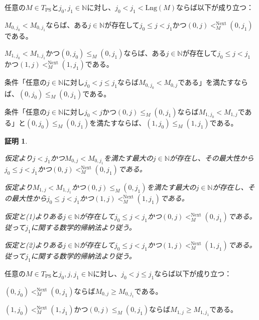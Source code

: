 \documentclass[dvipdfmx,uplatex]{jsarticle}
\theoremstyle{customnonumberbreakfortheorem}
\theoremstyle{customnonumberbreakforproof}
\newtheorem{hideableproof}{証明}
\begin{document}
\begin{proposition}[親の存在の判定条件]\label{親の存在の判定条件}
	任意の\(M \in T_{\textrm{PS}}\)と\(j_0,j_1 \in \mathbb{N}\)に対し、\(j_0 < j_1 < \textrm{Lng}(M)\)ならば以下が成り立つ：
	\begin{penumerate}
		\item \(M_{0,j_0} < M_{0,j_1}\)ならば、ある\(j \in \mathbb{N}\)が存在して\(j_0 \leq j < j_1\)かつ\((0,j) <_M^{\textrm{Next}} (0,j_1)\)である。
		\item \(M_{1,j_0} < M_{1,j_1}\)かつ\((0,j_0) \leq_M (0,j_1)\)ならば、ある\(j \in \mathbb{N}\)が存在して\(j_0 \leq j < j_1\)かつ\((1,j) <_M^{\textrm{Next}} (1,j_1)\)である。
		\item 条件「任意の\(j \in \mathbb{N}\)に対し\(j_0 < j \leq j_1\)ならば\(M_{0,j_0} < M_{0,j}\)である」を満たすならば、\((0,j_0) \leq_M (0,j_1)\)である。
		\item 条件「任意の\(j \in \mathbb{N}\)に対し\(j_0 < j\)かつ\((0,j) \leq_M (0,j_1)\)ならば\(M_{1,j_0} < M_{1,j}\)である」と\((0,j_0) \leq_M (0,j_1)\)を満たすならば、\((1,j_0) \leq_M (1,j_1)\)である。
	\end{penumerate}
\end{proposition}

\begin{hideableproof}
	\begin{penumerate}
		\item 仮定より\(j < j_1\)かつ\(M_{0,j} < M_{0,j_1}\)を満たす最大の\(j \in \mathbb{N}\)が存在し、その最大性から\(j_0 \leq j < j_1\)かつ\((0,j) <_M^{\textrm{Next}} (0,j_1)\)である。
		\item 仮定より\(M_{1,j} < M_{1,j_1}\)かつ\((0,j) \leq_M (0,j_1)\)を満たす最大の\(j \in \mathbb{N}\)が存在し、その最大性から\(j_0 \leq j < j_1\)かつ\((1,j) <_M^{\textrm{Next}} (1,j_1)\)である。
		\item 仮定と(1)よりある\(j \in \mathbb{N}\)が存在して\(j_0 \leq j < j_1\)かつ\((0,j) <_M^{\textrm{Next}} (0,j_1)\)である。従って\(j_1\)に関する数学的帰納法より従う。
		\setcounter{penumeratei}{2}
		\item 仮定と(2)よりある\(j \in \mathbb{N}\)が存在して\(j_0 \leq j < j_1\)かつ\((1,j) <_M^{\textrm{Next}} (1,j_1)\)である。従って\(j_1\)に関する数学的帰納法より従う。
	\end{penumerate}
\end{hideableproof}

\begin{proposition}[親の基本性質]\label{親の基本性質}
	任意の\(M \in T_{\textrm{PS}}\)と\(j_0,j,j_1 \in \mathbb{N}\)に対し、\(j_0 < j \leq j_1\)ならば以下が成り立つ：
	\begin{penumerate}
		\item \((0,j_0) <_M^{\textrm{Next}} (0,j_1)\)ならば\(M_{0,j} \geq M_{0,j_1}\)である。
		\item \((1,j_0) <_M^{\textrm{Next}} (1,j_1)\)かつ\((0,j) \leq_M (0,j_1)\)ならば\(M_{1,j} \geq M_{1,j_1}\)である。
	\end{penumerate}
\end{proposition}
\end{document}
